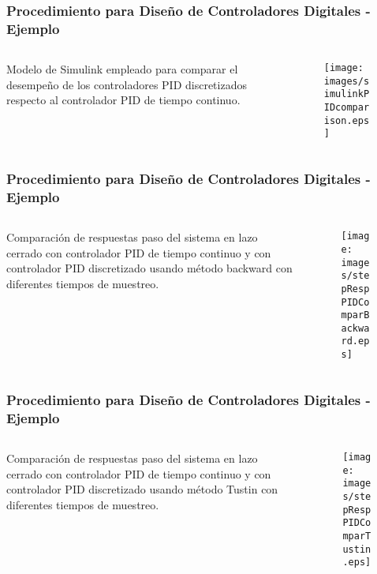 \documentclass[aspectratio=169,handout]{beamer}
\theoremstyle{definition}
\theoremstyle{plain}
\theoremstyle{remark}
\begin{document}
\begin{frame}[c]\frametitle{Procedimiento para Diseño de Controladores Digitales - Ejemplo}
	\begin{columns}
		\begin{column}{0.3\textwidth}
			Modelo de Simulink empleado para comparar el desempeño de los controladores PID discretizados respecto al controlador PID de tiempo continuo.
		\end{column}
		\begin{column}{0.7\textwidth}
		\begin{figure}
			\centering
			\texttt{[image: images/simulinkPIDcomparison.eps]}
		\end{figure}
		\end{column}
	\end{columns}
\end{frame}

\begin{frame}[c]\frametitle{Procedimiento para Diseño de Controladores Digitales - Ejemplo}
	\begin{columns}
		\begin{column}{0.3\textwidth}
			Comparación de respuestas paso del sistema en lazo cerrado con controlador PID de tiempo continuo y con controlador PID discretizado usando método backward con diferentes tiempos de muestreo.
		\end{column}
		\begin{column}{0.7\textwidth}
		\begin{figure}
			\centering
			\texttt{[image: images/stepRespPIDComparBackward.eps]}
		\end{figure}
		\end{column}
	\end{columns}
\end{frame}

\begin{frame}[c]\frametitle{Procedimiento para Diseño de Controladores Digitales - Ejemplo}
	\begin{columns}
		\begin{column}{0.3\textwidth}
			Comparación de respuestas paso del sistema en lazo cerrado con controlador PID de tiempo continuo y con controlador PID discretizado usando método Tustin con diferentes tiempos de muestreo.
		\end{column}
		\begin{column}{0.7\textwidth}
		\begin{figure}
			\centering
			\texttt{[image: images/stepRespPIDComparTustin.eps]}
		\end{figure}
		\end{column}
	\end{columns}
\end{frame}
\end{document}
